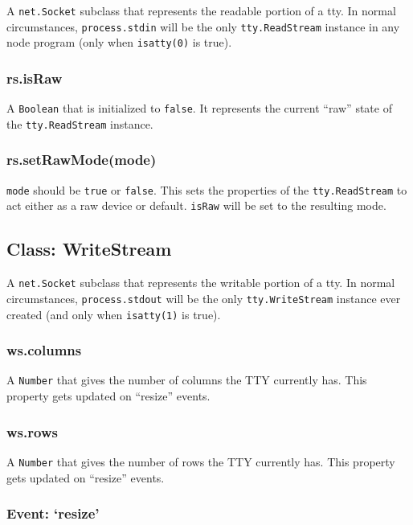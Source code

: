 A \texttt{net.Socket} subclass that represents the readable portion of a
tty. In normal circumstances, \texttt{process.stdin} will be the only
\texttt{tty.ReadStream} instance in any node program (only when
\texttt{isatty(0)} is true).

\subsubsection{rs.isRaw}\label{rs.israw}

A \texttt{Boolean} that is initialized to \texttt{false}. It represents
the current ``raw'' state of the \texttt{tty.ReadStream} instance.

\subsubsection{rs.setRawMode(mode)}\label{rs.setrawmodemode}

\texttt{mode} should be \texttt{true} or \texttt{false}. This sets the
properties of the \texttt{tty.ReadStream} to act either as a raw device
or default. \texttt{isRaw} will be set to the resulting mode.

\subsection{Class: WriteStream}\label{class-writestream}

A \texttt{net.Socket} subclass that represents the writable portion of a
tty. In normal circumstances, \texttt{process.stdout} will be the only
\texttt{tty.WriteStream} instance ever created (and only when
\texttt{isatty(1)} is true).

\subsubsection{ws.columns}\label{ws.columns}

A \texttt{Number} that gives the number of columns the TTY currently
has. This property gets updated on ``resize'' events.

\subsubsection{ws.rows}\label{ws.rows}

A \texttt{Number} that gives the number of rows the TTY currently has.
This property gets updated on ``resize'' events.

\subsubsection{\texorpdfstring{Event:
`resize'}{Event: resize}}\label{event-resize}

